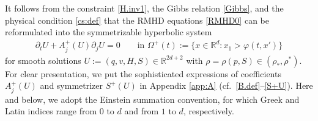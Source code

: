 \documentclass[twoside,11pt]{article}
\numberwithin{equation}{section}
\def\p{\partial}
\begin{document}
It follows from the constraint \eqref{H.inv1}, the Gibbs relation \eqref{Gibbs}, and the physical condition \eqref{cs:def} that the RMHD equations \eqref{RMHD0} can be reformulated into the symmetrizable hyperbolic system
	\begin{align}
		\label{RMHD:vec}
		\p_t U+%
		A_j^+(U)\p_j U=0\qquad \textrm{in } \Omega^+(t) :=\{x\in\mathbb{R}^d: x_1> \varphi(t,x') \}
	\end{align}
	for smooth %
	solutions $U:=(q,v,H,S)\in\mathbb{R}^{2d+2}$ with $\rho=\rho(p,S) \in (\rho_*,\rho^*)$.
	For clear presentation, we put the sophisticated expressions of coefficients $A_j^+(U)$ and symmetrizer $S^+(U)$ in Appendix \ref{app:A} (cf.~\eqref{B.def}--\eqref{S+U}).
Here and below, we adopt the Einstein summation convention, for which Greek and Latin indices range from $0$ to $d$ and from $1$ to $d$, respectively.	
	
\end{document}
